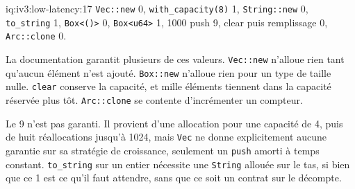 \begin{solution}{iq:iv3:low-latency:17}
\texttt{Vec::new} 0, \texttt{with\_capacity(8)} 1, \texttt{String::new} 0, \texttt{to\_string} 1, \texttt{Box<()>} 0, \texttt{Box<u64>} 1, 1000 push 9, clear puis remplissage 0, \texttt{Arc::clone} 0.

La documentation garantit plusieurs de ces valeurs. \texttt{Vec::new} n'alloue rien tant qu'aucun élément n'est ajouté. \texttt{Box::new} n'alloue rien pour un type de taille nulle. \texttt{clear} conserve la capacité, et mille éléments tiennent dans la capacité réservée plus tôt. \texttt{Arc::clone} se contente d'incrémenter un compteur.

Le 9 n'est pas garanti. Il provient d'une allocation pour une capacité de 4, puis de huit réallocations jusqu'à 1024, mais \texttt{Vec} ne donne explicitement aucune garantie sur sa stratégie de croissance, seulement un \texttt{push} amorti à temps constant. \texttt{to\_string} sur un entier nécessite une \texttt{String} allouée sur le tas, si bien que ce 1 est ce qu'il faut attendre, sans que ce soit un contrat sur le décompte.

\end{solution}

